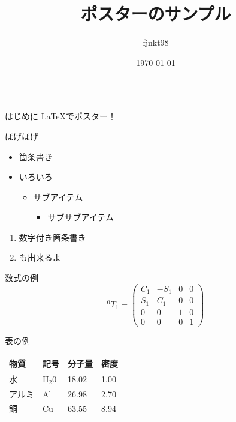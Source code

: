\documentclass[dvipdfmx, final, t]{beamer}
\title{ポスターのサンプル}
\author{fjnkt98}
\institute{NITIC}
\date{\today}
\begin{document}
\begin{frame}
  \begin{columns}[t]
    \begin{column}{.45\linewidth}
      \begin{block}{はじめに}
        \LaTeX でポスター！
      \end{block}

      \begin{block}{ほげほげ}
        \begin{itemize}
          \item 箇条書き
          \item いろいろ
          \begin{itemize}
            \item サブアイテム
            \begin{itemize}
              \item サブサブアイテム
            \end{itemize}
          \end{itemize}
        \end{itemize}

        \begin{enumerate}
          \item 数字付き箇条書き
          \item も出来るよ
        \end{enumerate}
      \end{block}

      \begin{block}{数式の例}
        \begin{equation*}
        {}^0\!T_{1}=\begin{pmatrix} C_{1} & -S_{1} & 0 & 0 \\ S_{1} & C_1 & 0 & 0 \\ 0 & 0 & 1 & 0 \\ 0 & 0 & 0 & 1 \end{pmatrix}
        \end{equation*}
      \end{block}

      \begin{block}{表の例}
        \begin{table}[h]
          \begin{tabular}{llll}
            \noalign{\hrule height 1pt}
            物質　 & 記号 & 分子量 & 密度 \\
            \hline
            水　　 & H$_2$0 & 18.02 & 1.00 \\
            アルミ & Al & 26.98 & 2.70 \\
            銅　　 & Cu & 63.55 & 8.94 \\
          \end{tabular}
        \end{table}
      \end{block}
    \end{column}


\end{columns}
\end{frame}
\end{document}

